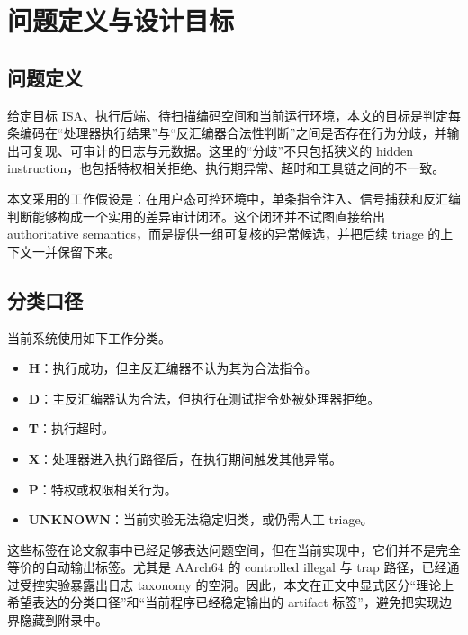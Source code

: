 \chapter{问题定义与设计目标}

\section{问题定义}

给定目标 ISA、执行后端、待扫描编码空间和当前运行环境，本文的目标是判定每条编码在“处理器执行结果”与“反汇编器合法性判断”之间是否存在行为分歧，并输出可复现、可审计的日志与元数据。这里的“分歧”不只包括狭义的 hidden instruction，也包括特权相关拒绝、执行期异常、超时和工具链之间的不一致。

本文采用的工作假设是：在用户态可控环境中，单条指令注入、信号捕获和反汇编判断能够构成一个实用的差异审计闭环。这个闭环并不试图直接给出 authoritative semantics，而是提供一组可复核的异常候选，并把后续 triage 的上下文一并保留下来。

\section{分类口径}

当前系统使用如下工作分类。
\begin{itemize}[leftmargin=2em]
  \item \textbf{H}：执行成功，但主反汇编器不认为其为合法指令。
  \item \textbf{D}：主反汇编器认为合法，但执行在测试指令处被处理器拒绝。
  \item \textbf{T}：执行超时。
  \item \textbf{X}：处理器进入执行路径后，在执行期间触发其他异常。
  \item \textbf{P}：特权或权限相关行为。
  \item \textbf{UNKNOWN}：当前实验无法稳定归类，或仍需人工 triage。
\end{itemize}

这些标签在论文叙事中已经足够表达问题空间，但在当前实现中，它们并不是完全等价的自动输出标签。尤其是 AArch64 的 controlled illegal 与 trap 路径，已经通过受控实验暴露出日志 taxonomy 的空洞。因此，本文在正文中显式区分“理论上希望表达的分类口径”和“当前程序已经稳定输出的 artifact 标签”，避免把实现边界隐藏到附录中。

